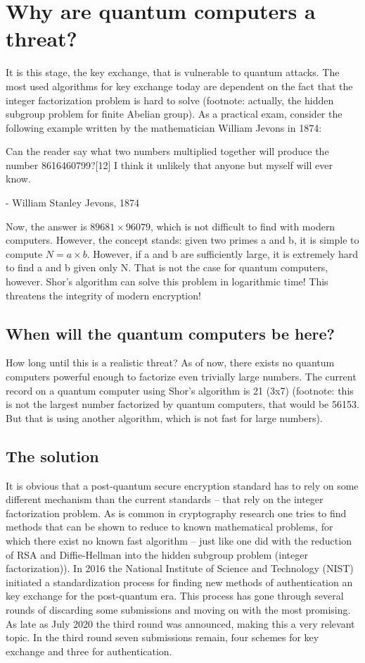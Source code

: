 \documentclass[conference]{IEEEtran}
\begin{document}
\section{Why are quantum computers a threat?}
It is this stage, the key exchange, that is vulnerable to quantum attacks.
The most used algorithms for key exchange today are dependent on the fact that the integer factorization problem is hard to solve (footnote: actually, the hidden subgroup problem for finite Abelian group).
As a practical exam, consider the following example written by the mathematician William Jevons in 1874:
\begin{quoting}
Can the reader say what two numbers multiplied together will produce the number 8616460799?[12] I think it unlikely that anyone but myself will ever know.
 
- William Stanley Jevons, 1874
\end{quoting}
Now, the answer is $89681 \times 96079$, which is not difficult to find with modern computers.
However, the concept stands: given two primes a and b, it is simple to compute $N = a \times b$.
However, if a and b are sufficiently large, it is extremely hard to find a and b given only N.
That is not the case for quantum computers, however.
Shor's algorithm can solve this problem in logarithmic time!
This threatens the integrity of modern encryption!

\subsection{When will the quantum computers be here?}
How long until this is a realistic threat?
As of now, there exists no quantum computers powerful enough to factorize even trivially large numbers.
The current record on a quantum computer using Shor's algorithm is 21 (3x7) (footnote: this is not the largest number factorized by quantum computers, that would be 56153. But that is using another algorithm, which is not fast for large numbers).

\subsection{The solution}
It is obvious that a post-quantum secure encryption standard has to rely on some different mechanism than the current standards -- that rely on the integer factorization problem.
As is common in cryptography research one tries to find methods that can be shown to reduce to known mathematical problems, for which there exist no known fast algorithm -- just like one did with the reduction of RSA and Diffie-Hellman into the hidden subgroup problem (integer factorization)).
In 2016 the National Institute of Science and Technology (NIST) initiated a standardization process for finding new methods of authentication an key exchange for the post-quantum era.
This process has gone through several rounds of discarding some submissions and moving on with the most promising.
As late as July 2020 the third round was announced, making this a very relevant topic.
In the third round seven submissions remain, four schemes for key exchange and three for authentication.
\end{document}
